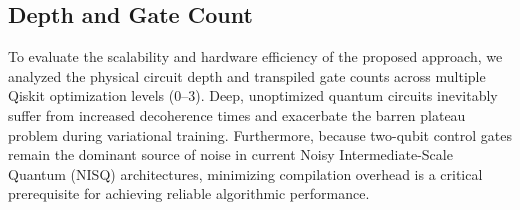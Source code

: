 \documentclass[11pt]{article}
\begin{document}

\subsection{Depth and Gate Count}

To evaluate the scalability and hardware efficiency of the proposed approach, we analyzed the physical circuit depth and transpiled gate counts across multiple Qiskit optimization levels (0–3). Deep, unoptimized quantum circuits inevitably suffer from increased decoherence times and exacerbate the barren plateau problem during variational training. Furthermore, because two-qubit control gates remain the dominant source of noise in current Noisy Intermediate-Scale Quantum (NISQ) architectures, minimizing compilation overhead is a critical prerequisite for achieving reliable algorithmic performance.
\end{document}
